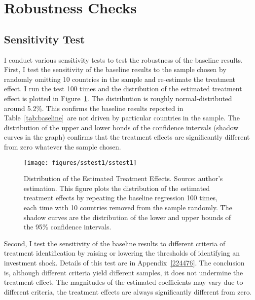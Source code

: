 \documentclass[10pt,a4paper]{article}
\begin{document}
\par\null

\section{Robustness Checks}

{\label{351972}}

\subsection{Sensitivity Test}

{\label{254092}}

I conduct various sensitivity tests to test the robustness of the
baseline results. First, I test the sensitivity of the baseline results
to the sample chosen by randomly omitting 10 countries in the sample and
re-estimate the treatment effect. I run the test 100 times and the
distribution of the estimated treatment effect is plotted in
Figure~{\ref{339676}}. The distribution is roughly
normal-distributed around 5.2\%. This confirms the baseline results
reported in Table~{\ref{tab:baseline}}~are not driven
by particular countries in the sample. The distribution of the upper and
lower bonds of the confidence intervals (shadow curves in the graph)
confirms that the treatment effects are significantly different from
zero whatever the sample chosen.~
\begin{figure}[H]
\begin{center}
\texttt{[image: figures/sstest1/sstest1]}
\caption{{Distribution of the Estimated Treatment Effects. Source: author's
estimation. This figure plots the distribution of the estimated
treatment effects by repeating the baseline regression 100 times, each
time with 10 countries removed from the sample randomly. The shadow
curves are the distribution of the lower and upper bounds of the 95\%
confidence intervals. ~~
{\label{339676}}%
}}
\end{center}
\end{figure}

Second, I test the sensitivity of the baseline results to different
criteria of treatment identification by raising or lowering the
thresholds of identifying an investment shock. Details of this test are
in Appendix~{\ref{224476}}. The conclusion is, although
different criteria yield different samples, it does not undermine the
treatment effect. The magnitudes of the estimated coefficients may vary
due to different criteria, the treatment effects are always
significantly different from zero. ~
\end{document}
